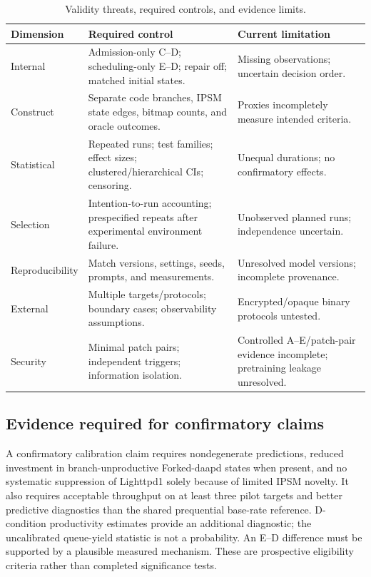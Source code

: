 \documentclass[final,5p,times,number]{elsarticle}
\begin{document}
\begin{table}[!tbp]
\centering\small
\caption{Validity threats, required controls, and evidence limits.}
\label{tab:threats}
\begin{tabularx}{\textwidth}{l Y Y}
\toprule
Dimension & Required control & Current limitation \\
\midrule
Internal & Admission-only C--D; scheduling-only E--D; repair off; matched initial states. & Missing observations; uncertain decision order. \\
Construct & Separate code branches, IPSM state edges, bitmap counts, and oracle outcomes. & Proxies incompletely measure intended criteria. \\
Statistical & Repeated runs; test families; effect sizes; clustered/hierarchical CIs; censoring. & Unequal durations; no confirmatory effects. \\
Selection & Intention-to-run accounting; prespecified repeats after experimental environment failure. & Unobserved planned runs; independence uncertain. \\
Reproducibility & Match versions, settings, seeds, prompts, and measurements. & Unresolved model versions; incomplete provenance. \\
External & Multiple targets/protocols; boundary cases; observability assumptions. & Encrypted/opaque binary protocols untested. \\
Security & Minimal patch pairs; independent triggers; information isolation. & Controlled A--E/patch-pair evidence incomplete; pretraining leakage unresolved. \\
\bottomrule
\end{tabularx}
\end{table}

\subsection{Evidence required for confirmatory claims}
A confirmatory calibration claim requires nondegenerate predictions, reduced investment in branch-unproductive Forked-daapd states when present, and no systematic suppression of Lighttpd1 solely because of limited IPSM novelty. It also requires acceptable throughput on at least three pilot targets and better predictive diagnostics than the shared prequential base-rate reference. D-condition productivity estimates provide an additional diagnostic; the uncalibrated queue-yield statistic is not a probability. An E--D difference must be supported by a plausible measured mechanism. These are prospective eligibility criteria rather than completed significance tests.
\end{document}
